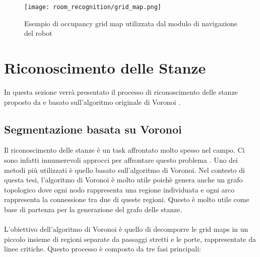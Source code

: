 \begin{figure}[H]
  \centering
  \texttt{[image: room\_recognition/grid\_map.png]}
  \caption{Esempio di occupancy grid map utilizzata dal modulo di navigazione del robot}
\end{figure}

\section{Riconoscimento delle Stanze}
In questa sezione verrà presentato il processo di riconoscimento delle stanze proposto da \cite{mora} e basato sull'algoritmo originale di Voronoi \cite{thrun}.

\subsection{Segmentazione basata su Voronoi}
Il riconoscimento delle stanze è un task affrontato molto spesso nel campo. Ci sono infatti innumerevoli approcci per affrontare questo problema \cite{bormann}. Uno dei metodi più utilizzati è quello basato sull'algoritmo di Voronoi. Nel contesto di questa tesi, l'algoritmo di Voronoi \cite{thrun} è molto utile poichè genera anche un grafo topologico dove ogni nodo rappresenta una regione individuata e ogni arco rappresenta la connessione tra due di queste regioni. Questo è molto utile come base di partenza per la generazione del grafo delle stanze.\\\\
L'obiettivo dell'algoritmo di Voronoi è quello di decomporre le grid maps in un piccolo insieme di regioni separate da passaggi stretti e le porte, rappresentate da linee critiche. Questo processo è composto da tre fasi principali:
